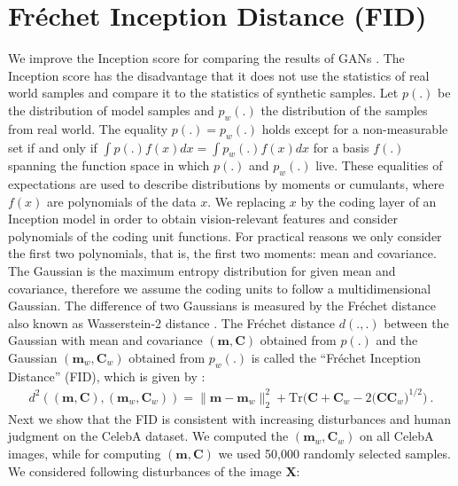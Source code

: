 \documentclass{article}
\newcommand\Bm{\bm{m}}
\newcommand\BC{\bm{C}}
\newcommand\BX{\bm{X}}
\newcommand\TR{\mathbf{\mathrm{Tr}}}
\begin{document}
\tableofcontents

\section{Fr\'{e}chet Inception Distance (FID)}
\label{sec:fid}

We improve the Inception score for comparing the results of GANs
\cite{Salimans:16}.
The Inception score has the disadvantage that it does not use
the statistics of real world samples and compare it to
the statistics of synthetic samples.
Let $p(.)$ be the distribution of model samples and $p_w(.)$ the
distribution of the samples from real world.
The equality $p(.)=p_w(.)$ holds except for a non-measurable set
if and only if $\int p(.) f(x) dx=\int p_w(.) f(x) dx$ for
a basis $f(.)$ spanning the function space in which $p(.)$ and $p_w(.)$
live.
These equalities of expectations are used to describe distributions
by moments or cumulants, where $f(x)$ are polynomials of the data $x$.
We replacing $x$ by the coding layer of
an Inception model in order to obtain vision-relevant features and
consider polynomials of the coding unit functions.
For practical reasons we only consider the first two polynomials, that
is, the first two moments: mean and covariance.
The Gaussian is the maximum entropy distribution for given
mean and covariance, therefore we assume the coding units to follow a
multidimensional Gaussian.
The difference of two Gaussians is measured by the Fr\'{e}chet
distance \cite{Frechet:57}
also known as Wasserstein-2 distance \cite{Wasserstein:69}.
The Fr\'{e}chet distance
$d(.,.)$ between the Gaussian with mean and covariance $(\Bm,\BC)$ obtained
from $p(.)$ and the Gaussian $(\Bm_w,\BC_w)$ obtained
from $p_w(.)$ is called the ``Fr\'{e}chet Inception Distance'' (FID), which is
given by \cite{Dowson:82}:
\begin{align}
d^2((\Bm,\BC),(\Bm_w,\BC_w))=\|\Bm-\Bm_w\|_2^2+  \TR \bigl(\BC+\BC_w-2\bigl(
\BC\BC_w\bigr)^{1/2}\bigr) \ .
\end{align}
Next we show that the FID is consistent with
increasing disturbances and human judgment on the CelebA dataset.
We computed the $(\Bm_w,\BC_w)$ on all CelebA images, while
for computing $(\Bm,\BC)$ we used 50,000 randomly selected samples.
We considered following disturbances of the image $\BX$:
\end{document}
